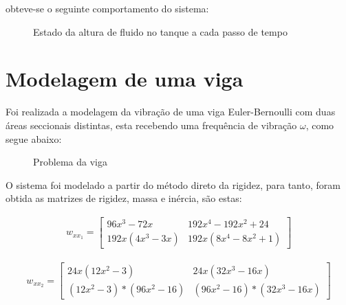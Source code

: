 \documentclass[fleqn, 11pt]{article}
\begin{document}
obteve-se o seguinte comportamento do sistema:

\begin{figure}[H]
\label{figure:tanque_saida}
   \caption{Estado da altura de fluido no tanque a cada passo de tempo}
\end{figure}
\newpage
\section{Modelagem de uma viga}
Foi realizada a modelagem da vibração de uma viga Euler-Bernoulli com duas áreas seccionais distintas, esta recebendo uma frequência de vibração $\omega$, como segue abaixo:
\begin{figure}[H]
\label{figure:viga}
   \caption{Problema da viga}
\end{figure}
O sistema foi modelado a partir do método direto da rigidez, para tanto, foram obtida as matrizes de rigidez, massa e inércia, são estas:


\begin{align*}
w_{xx_{1}} = \begin{bmatrix}
96x^3 - 72x & 192x^4 - 192x^2 + 24 \\ 
192x(4x^3 - 3x) & 192x(8x^4-8x^2+1)
\end{bmatrix} 
\end{align*}

\begin{align*}
w_{xx_{2}} = \begin{bmatrix}
24x(12x^2-3) & 24x(32x^3 - 16x) \\
(12x^2-3)*(96x^2-16) & (96x^2-16)*(32x^3-16x)
\end{bmatrix} \\
\end{align*}
\end{document}
